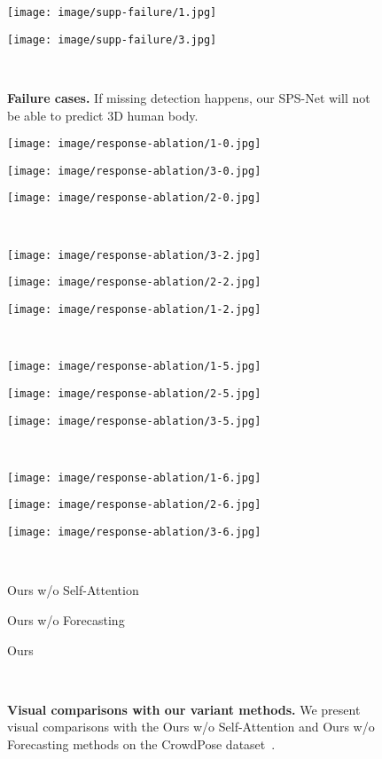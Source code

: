 \documentclass[times,referee,twocolumn,final,authoryear]{elsarticle}
\newcommand{\revised}[1]{{{#1}}}
\newcommand{\mpage}[2]
{
\begin{minipage}{#1\textwidth}\centering
#2
\end{minipage}
}
\begin{document}
\begin{figure}[t]
  \begin{center}
  \mpage{0.234}{\texttt{[image: image/supp-failure/1.jpg]}} \hfill
  \mpage{0.234}{\texttt{[image: image/supp-failure/3.jpg]}} \\
\vspace{-1.0mm}
  \caption{
  \textbf{Failure cases.} 
If missing detection happens, our SPS-Net will not be able to predict 3D human body.
}
  \label{fig:failure}
  \end{center}
  \vspace{-8.0mm}
\end{figure}

\begin{figure*}[t]
  \begin{center}
\mpage{0.32}{\texttt{[image: image/response-ablation/1-0.jpg]}} \hfill
  \mpage{0.32}{\texttt{[image: image/response-ablation/3-0.jpg]}} \hfill
  \mpage{0.32}{\texttt{[image: image/response-ablation/2-0.jpg]}} \\
\vspace{2.0mm}
  \mpage{0.32}{\texttt{[image: image/response-ablation/3-2.jpg]}} \hfill
  \mpage{0.32}{\texttt{[image: image/response-ablation/2-2.jpg]}} \hfill
  \mpage{0.32}{\texttt{[image: image/response-ablation/1-2.jpg]}} \\
\vspace{2.0mm}
  \mpage{0.32}{\texttt{[image: image/response-ablation/1-5.jpg]}} \hfill
  \mpage{0.32}{\texttt{[image: image/response-ablation/2-5.jpg]}} \hfill
  \mpage{0.32}{\texttt{[image: image/response-ablation/3-5.jpg]}} \\
\vspace{2.0mm}
  \mpage{0.32}{\texttt{[image: image/response-ablation/1-6.jpg]}} \hfill
  \mpage{0.32}{\texttt{[image: image/response-ablation/2-6.jpg]}} \hfill
  \mpage{0.32}{\texttt{[image: image/response-ablation/3-6.jpg]}} \\
\vspace{2.0mm}
  \mpage{0.32}{Ours w/o Self-Attention } \hfill
  \mpage{0.32}{Ours w/o Forecasting } \hfill
  \mpage{0.32}{Ours} \\
\vspace{-2.0mm}
  \caption{
  \textbf{Visual comparisons with our variant methods.} 
\revised{
  We present visual comparisons with the Ours w/o Self-Attention  and Ours w/o Forecasting  methods on the CrowdPose dataset~\citep{li2019crowdpose}.
}
}
  \label{fig:visual-ablation}
  \end{center}
  \vspace{-7.0mm}
\end{figure*}
\end{document}
